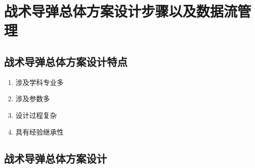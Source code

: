 \chapter{战术导弹总体方案设计步骤以及数据流管理}
\section{战术导弹总体方案设计特点}
\begin{enumerate}[1.]
    \item 涉及学科专业多
    \item 涉及参数多
    \item 设计过程复杂
    \item 具有经验继承性
\end{enumerate}
\section{战术导弹总体方案设计}
